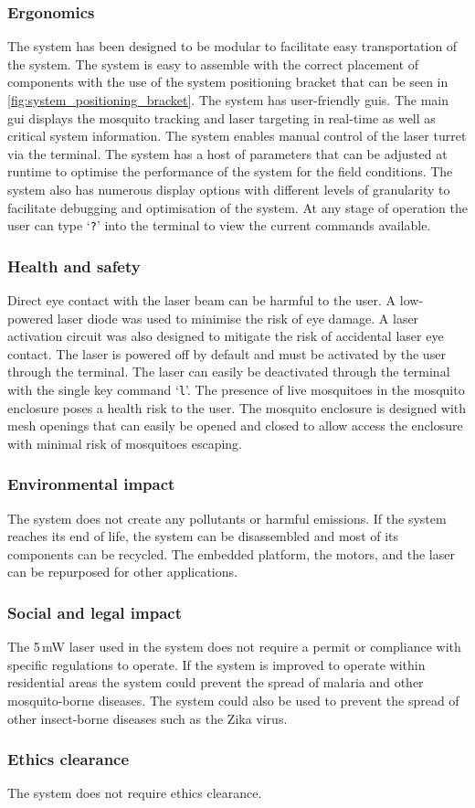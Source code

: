 \subsubsection{Ergonomics}
The system has been designed to be modular to facilitate easy transportation of the system. The system is easy to assemble with the correct placement of components with the use of the system positioning bracket that can be seen in \autoref{fig:system_positioning_bracket}. The system has user-friendly \glspl{gui}. The main \gls{gui} displays the mosquito tracking and laser targeting in real-time as well as critical system information. The system enables manual control of the laser turret via the terminal. The system has a host of parameters that can be adjusted at runtime to optimise the performance of the system for the field conditions. The system also has numerous display options with different levels of granularity to facilitate debugging and optimisation of the system. At any stage of operation the user can type `\texttt{?}' into the terminal to view the current commands available.

\subsubsection{Health and safety}
Direct eye contact with the laser beam can be harmful to the user. A low-powered laser diode was used to minimise the risk of eye damage. A laser activation circuit was also designed to mitigate the risk of accidental laser eye contact. The laser is powered off by default and must be activated by the user through the terminal. The laser can easily be deactivated through the terminal with the single key command `\texttt{l}'. The presence of live mosquitoes in the mosquito enclosure poses a health risk to the user. The mosquito enclosure is designed with mesh openings that can easily be opened and closed to allow access the enclosure with minimal risk of mosquitoes escaping.

\subsubsection{Environmental impact}
The system does not create any pollutants or harmful emissions. If the system reaches its end of life, the system can be disassembled and most of its components can be recycled. The embedded platform, the motors, and the laser can be repurposed for other applications.

\subsubsection{Social and legal impact}
The 5\,mW laser used in the system does not require a permit or compliance with specific regulations to operate. If the system is improved to operate within residential areas the system could prevent the spread of malaria and other mosquito-borne diseases. The system could also be used to prevent the spread of other insect-borne diseases such as the Zika virus.

\subsubsection{Ethics clearance}
The system does not require ethics clearance.

\newpage



